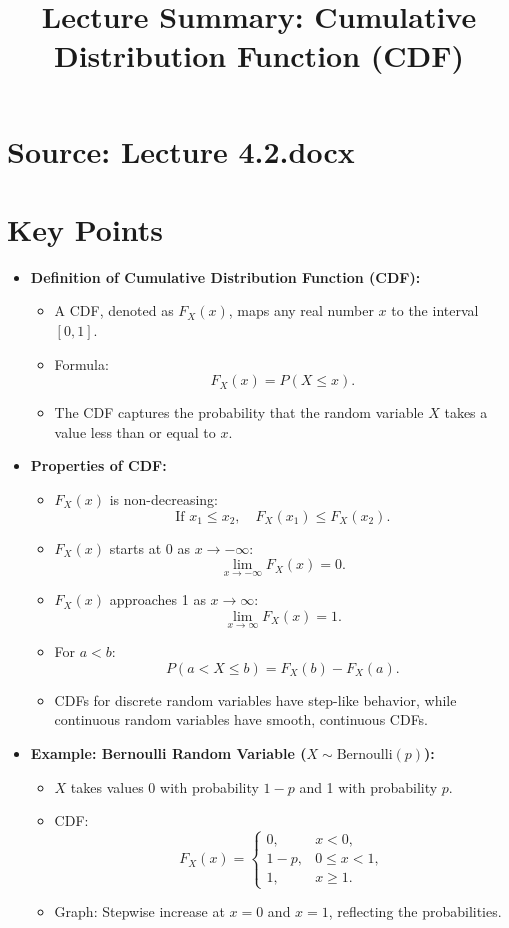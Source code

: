 \documentclass{article}
\title{Lecture Summary: Cumulative Distribution Function (CDF)}
\author{}
\date{}
\begin{document}
\maketitle

\section*{Source: Lecture 4.2.docx}

\section*{Key Points}

\begin{itemize}
  \item \textbf{Definition of Cumulative Distribution Function (CDF):}
    \begin{itemize}
      \item A CDF, denoted as $F_X(x)$, maps any real number $x$ to the interval $[0, 1]$.
      \item Formula:
        \[
          F_X(x) = P(X \leq x).
        \]
      \item The CDF captures the probability that the random variable $X$ takes a value less than or equal to $x$.
    \end{itemize}

  \item \textbf{Properties of CDF:}
    \begin{itemize}
      \item $F_X(x)$ is non-decreasing:
        \[
          \text{If } x_1 \leq x_2, \quad F_X(x_1) \leq F_X(x_2).
        \]
      \item $F_X(x)$ starts at 0 as $x \to -\infty$:
        \[
          \lim_{x \to -\infty} F_X(x) = 0.
        \]
      \item $F_X(x)$ approaches 1 as $x \to \infty$:
        \[
          \lim_{x \to \infty} F_X(x) = 1.
        \]
      \item For $a < b$:
        \[
          P(a < X \leq b) = F_X(b) - F_X(a).
        \]
      \item CDFs for discrete random variables have step-like behavior, while continuous random variables have smooth, continuous CDFs.
    \end{itemize}

  \item \textbf{Example: Bernoulli Random Variable ($X \sim \text{Bernoulli}(p)$):}
    \begin{itemize}
      \item $X$ takes values 0 with probability $1-p$ and 1 with probability $p$.
      \item CDF:
        \[
          F_X(x) =
          \begin{cases}
            0, & x < 0, \\
            1 - p, & 0 \leq x < 1, \\
            1, & x \geq 1.
          \end{cases}
        \]
      \item Graph: Stepwise increase at $x = 0$ and $x = 1$, reflecting the probabilities.
    \end{itemize}


\end{itemize}
\end{document}
